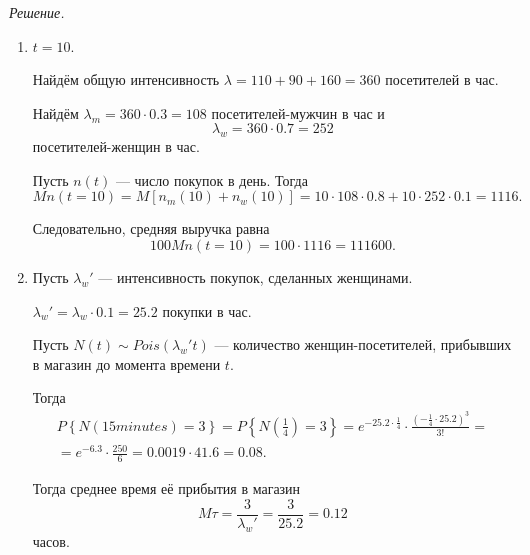 \textit{Решение.}
\begin{enumerate}[label=\alph*)]
  \item $t = 10$.

  Найдём общую интенсивность $ \lambda = 110 + 90 + 160 = 360$ посетителей в час.

  Найдём $ \lambda_m = 360 \cdot 0.3 = 108$ посетителей-мужчин в час и
  $$ \lambda_w =
    360 \cdot 0.7 =
    252$$
  посетителей-женщин в час.

  Пусть $n \left( t \right) $ --- число покупок в день.
  Тогда
  $$Mn \left( t = 10 \right) =
    M \left[ n_m \left( 10 \right) + n_w \left( 10 \right) \right] =
    10 \cdot 108 \cdot 0.8 + 10 \cdot 252 \cdot 0.1 =
    1116.$$

  Следовательно, средняя выручка равна
  $$100Mn \left( t = 10 \right) =
    100 \cdot 1116 =
    111600.$$
  \item Пусть $ \lambda_w'$ --- интенсивность покупок, сделанных женщинами.

  $ \lambda_w' = \lambda_w \cdot 0.1 = 25.2$ покупки в час.

  Пусть $N \left( t \right) \sim Pois \left( \lambda_w' t \right) $ ---
  количество женщин-посетителей, прибывших в магазин до момента времени $t$.

  Тогда
  \begin{gather*}
    P \left\{ N \left( 15 minutes \right) = 3 \right\} =
    P \left\{ N \left( \frac{1}{4} \right) = 3 \right\} =
    e^{-25.2 \cdot \frac{1}{4}} \cdot \frac{ \left( -\frac{1}{4} \cdot 25.2 \right)^3}{3!} = \\
    = e^{-6.3} \cdot \frac{250}{6} =
    0.0019 \cdot 41.6 =
    0.08.
  \end{gather*}

  Тогда среднее время её прибытия в магазин
  $$M \tau =
    \frac{3}{ \lambda_w'} =
    \frac{3}{25.2} =
    0.12$$
  часов.
\end{enumerate}
